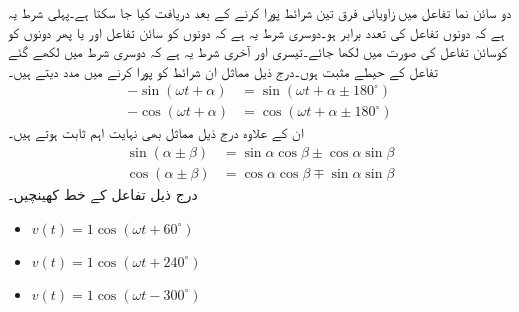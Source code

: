 دو سائن نما تفاعل میں زاویائی فرق  تین شرائط پورا کرنے کے بعد دریافت کیا جا سکتا ہے۔پہلی شرط یہ ہے کہ دونوں تفاعل کی تعدد برابر ہو۔دوسری شرط یہ ہے کہ دونوں کو  سائن تفاعل اور یا پھر دونوں کو  کوسائن تفاعل کی صورت میں لکھا جائے۔تیسری اور آخری شرط یہ ہے کہ دوسری شرط میں لکھے گئے تفاعل کے حیطے مثبت ہوں۔درج ذیل مماثل ان شرائط کو پورا کرنے میں مدد دیتے ہیں۔
\begin{align}
-\sin(\omega t+\alpha)&=\sin(\omega t+\alpha \pm 180^{\circ})\label{مساوات_بدلتا_آدھی_طول_منفی_موج_الف}\\
-\cos(\omega t+\alpha)&=\cos(\omega t+\alpha \pm 180^{\circ})\label{مساوات_بدلتا_آدھی_طول_منفی_موج_ب}
\end{align}
ان کے علاوہ درج ذیل مماثل بھی نہایت اہم ثابت ہوتے ہیں۔
\begin{align}
\sin(\alpha\pm\beta)&=\sin \alpha \cos \beta \pm \cos \alpha \sin \beta\\
\cos(\alpha \pm \beta)&=\cos \alpha \cos \beta \mp \sin \alpha \sin \beta 
\end{align}
درج ذیل تفاعل کے خط کھینچیں۔
\begin{itemize}
\item
$v(t)=1 \cos (\omega t +60^{\circ})$
\item
$v(t)=1 \cos (\omega t +240^{\circ})$
\item
$v(t)=1 \cos (\omega t -300^{\circ})$
\end{itemize}

